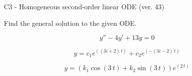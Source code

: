 \begin{exercise}
  \begin{exerciseTitle}C3 - Homogeneous second-order linear ODE (ver. 43)\end{exerciseTitle}
  \begin{exerciseStatement}
    
Find the general solution to the given ODE.

    
\[y''-4y'+13y = 0\]

  \end{exerciseStatement}
  \begin{exerciseAnswer}
    
\[y= c_{1} e^{\left(\left(3 i + 2\right) \, t\right)} + c_{2} e^{\left(-\left(3 i - 2\right) \, t\right)}\]

    
\[y= {\left(k_{1} \cos\left(3 \, t\right) + k_{2} \sin\left(3 \, t\right)\right)} e^{\left(2 \, t\right)}\]

  \end{exerciseAnswer}
\end{exercise}